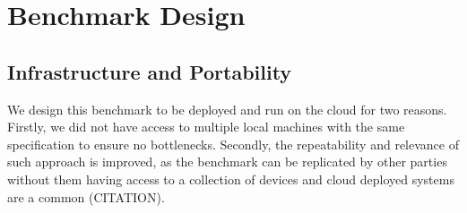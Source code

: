 \section{Benchmark Design}
\label{cha:benchmarkdesign}

%
%
%


\subsection{Infrastructure and Portability}
We design this benchmark to be deployed and run on the cloud for two reasons.
Firstly, we did not have access to multiple local machines with the same specification to ensure no bottlenecks.
Secondly, the repeatability and relevance of such approach is improved, as the benchmark can be replicated by other parties without them having access to a collection of devices and cloud deployed systems are a common (CITATION).

